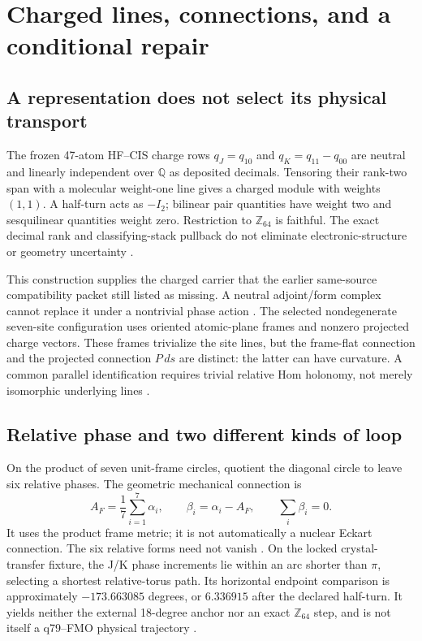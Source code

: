 \documentclass[11pt]{article}
\theoremstyle{definition}
\theoremstyle{remark}
\begin{document}
\section{Charged lines, connections, and a conditional repair}
\label{sec:charged-repair}

\subsection{A representation does not select its physical transport}
\label{sec:charged-module}
The frozen 47-atom HF--CIS charge rows
\(q_J=q_{10}\) and \(q_K=q_{11}-q_{00}\) are neutral and linearly independent
over \(\mathbb Q\) as deposited decimals. Tensoring their rank-two span
with a molecular weight-one line gives a charged module with weights
\((1,1)\). A half-turn acts as \(-I_2\); bilinear pair quantities have
weight two and sesquilinear quantities weight zero. Restriction to
\(\mathbb Z_{64}\) is faithful. The exact decimal rank and classifying-stack
pullback do not eliminate electronic-structure or geometry uncertainty
\cite{beq28}.

This construction supplies the charged carrier that the earlier
same-source compatibility packet still listed as missing. A neutral
adjoint/form complex cannot replace it under a nontrivial phase action
\cite{beq47}. The selected nondegenerate seven-site configuration uses
oriented atomic-plane frames and nonzero projected charge vectors. These
frames trivialize the site lines, but the frame-flat connection and the
projected connection \(P\,ds\) are distinct: the latter can have curvature.
A common parallel identification requires trivial relative Hom holonomy,
not merely isomorphic underlying lines \cite{beq29}.

\subsection{Relative phase and two different kinds of loop}
\label{sec:phase-geometry}
On the product of seven unit-frame circles, quotient the diagonal circle
to leave six relative phases. The geometric mechanical connection is
\[
A_F=\frac17\sum_{i=1}^7\alpha_i,\qquad
\beta_i=\alpha_i-A_F,\qquad \sum_i\beta_i=0.
\]
It uses the product frame metric; it is not automatically a nuclear
Eckart connection. The six relative forms need not vanish
\cite{beq30}. On the locked crystal-transfer fixture, the J/K phase
increments lie within an arc shorter than \(\pi\), selecting a shortest
relative-torus path. Its horizontal endpoint comparison is approximately
\(-173.663085\) degrees, or \(6.336915\) after the declared half-turn.
It yields neither the external 18-degree anchor nor an exact
\(\mathbb Z_{64}\) step, and is not itself a q79--FMO physical trajectory
\cite{beq31}.
\end{document}
